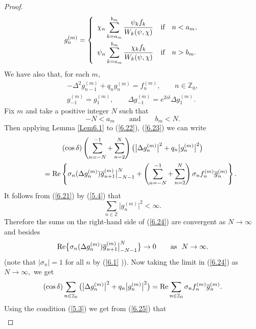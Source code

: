 \documentclass[11pt]{article}
\numberwithin{equation}{section}
\begin{document}
\begin{proof}
\begin{gather}
g_{n}^{(m)}=\left\{
\begin{array}{lll}
\displaystyle \chi _{n}\sum_{k=a_{m}}^{b_{m}}\frac{\psi _{k}f_{k}}{W_{k}(\psi ,\chi )} &
\text{if} & n<a_{m}, \vspace{1mm}\\
\displaystyle \psi _{n}\sum_{k=a_{m}}^{b_{m}}\frac{\chi _{k}f_{k}}{W_{k}(\psi ,\chi )} &
\text{if} & n>b_{m}.%
\end{array}%
\right.  \label{6.21}
\end{gather}%
We have also that, for each $m,$%
\begin{gather}
-\Delta ^{2}g_{n-1}^{(m)}+q_{n}g_{n}^{(m)}=f_{n}^{(m)},\qquad n\in
\mathbb{Z}
_{0},  \label{6.22}
\\
g_{-1}^{(m)}=g_{1}^{(m)},\qquad \Delta g_{-1}^{(m)}=e^{2i\delta }\Delta
g_{1}^{(m)}.  \label{6.23}
\end{gather}%
Fix $m$ and take a positive integer $N$ such that%
\[
-N<a_{m}\qquad \text{and} \qquad b_{m}<N.
\]%
Then applying Lemma \ref{Lem6.1} to (\ref{6.22}), (\ref{6.23}) we can write%
\begin{gather}
(\cos \delta )\left( \sum_{n=-N}^{-1}+\sum_{n=2}^{N}\right) \big(
\big\vert \Delta g_{n}^{(m)}\big\vert ^{2}+q_{n}\big\vert
g_{n}^{(m)}\big\vert ^{2}\big)  \nonumber \\
\qquad {}= {\rm Re}\left\{ \sigma _{n}(\Delta g_{n}^{(m)})\overline{g}%
_{n+1}^{(m)}\big| _{-N-1}^{N}+\left( \sum_{n=-N}^{-1}+\sum_{n=2}^{N}\right)
\sigma _{n}f_{n}^{(m)}\overline{g}_{n}^{(m)}\right\} .  \label{6.24}
\end{gather}%
It follows from (\ref{6.21}) by (\ref{5.4}) that%
\[
\sum_{n\in
\mathbb{Z}
}\big\vert g_{n}^{(m)}\big\vert ^{2}<\infty.
\]
Therefore the sums on the right-hand side of (\ref{6.24}) are convergent as $%
N\rightarrow \infty $ and besides%
\[
{\rm Re}\big\{ \sigma _{n}(\Delta g_{n}^{(m)})\overline{g}_{n+1}^{(m)}\big|
_{-N-1}^{N}\big\} \rightarrow 0\qquad \text{as} \ \  N\rightarrow \infty .
\]%
(note that $\left\vert \sigma _{n}\right\vert =1$ for all $n$ by (\ref{6.1}%
)). Now taking the limit in (\ref{6.24}) as $N\rightarrow \infty ,$ we get%
\begin{equation}
(\cos \delta )\sum_{n\in
\mathbb{Z}
_{0}}\big( \big\vert \Delta g_{n}^{(m)}\big\vert ^{2}+q_{n}\big\vert
g_{n}^{(m)}\big\vert ^{2}\big) ={\rm Re}\sum_{n\in
\mathbb{Z}
_{0}}\sigma _{n}f_{n}^{(m)}\overline{g}_{n}^{(m)}.  \label{6.25}
\end{equation}%
Using the condition (\ref{5.3}) we get from (\ref{6.25}) that%
\begin{gather*}

\end{gather*}
\end{proof}
\end{document}
